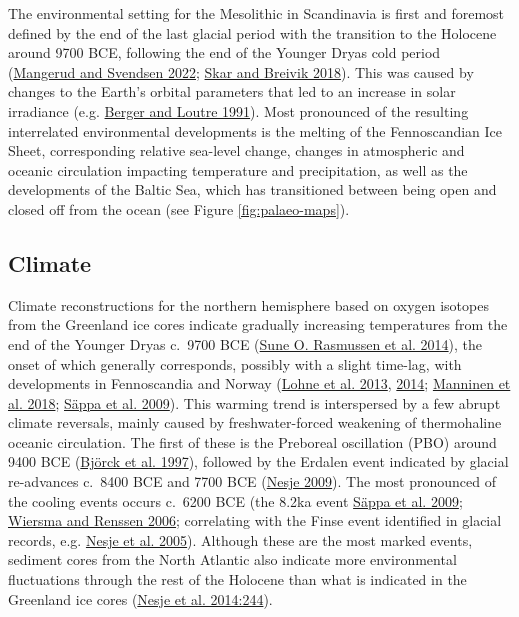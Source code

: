 \documentclass[
  12pt,
  a4paper,
  oneside]{book}
\begin{document}
The environmental setting for the Mesolithic in Scandinavia is first and foremost defined by the end of the last glacial period with the transition to the Holocene around 9700 BCE, following the end of the Younger Dryas cold period (\protect\hyperlink{ref-mangerud2022}{Mangerud and Svendsen 2022}; \protect\hyperlink{ref-skar2018}{Skar and Breivik 2018}). This was caused by changes to the Earth's orbital parameters that led to an increase in solar irradiance (e.g. \protect\hyperlink{ref-berger1991}{Berger and Loutre 1991}). Most pronounced of the resulting interrelated environmental developments is the melting of the Fennoscandian Ice Sheet, corresponding relative sea-level change, changes in atmospheric and oceanic circulation impacting temperature and precipitation, as well as the developments of the Baltic Sea, which has transitioned between being open and closed off from the ocean (see Figure \ref{fig:palaeo-maps}).

\hypertarget{climate}{%
\subsection{Climate}\label{climate}}

Climate reconstructions for the northern hemisphere based on oxygen isotopes from the Greenland ice cores indicate gradually increasing temperatures from the end of the Younger Dryas c.~9700 BCE (\protect\hyperlink{ref-rasmussen2014}{Sune O. Rasmussen et al. 2014}), the onset of which generally corresponds, possibly with a slight time-lag, with developments in Fennoscandia and Norway (\protect\hyperlink{ref-lohne2013}{Lohne et al. 2013}, \protect\hyperlink{ref-lohne2014}{2014}; \protect\hyperlink{ref-manninen2018}{Manninen et al. 2018}; \protect\hyperlink{ref-seppa2009}{Säppa et al. 2009}). This warming trend is interspersed by a few abrupt climate reversals, mainly caused by freshwater-forced weakening of thermohaline oceanic circulation. The first of these is the Preboreal oscillation (PBO) around 9400 BCE (\protect\hyperlink{ref-bjorck1997}{Björck et al. 1997}), followed by the Erdalen event indicated by glacial re-advances c.~8400 BCE and 7700 BCE (\protect\hyperlink{ref-nesje2009}{Nesje 2009}). The most pronounced of the cooling events occurs c.~6200 BCE (the 8.2ka event \protect\hyperlink{ref-seppa2009}{Säppa et al. 2009}; \protect\hyperlink{ref-wiersma2006}{Wiersma and Renssen 2006}; correlating with the Finse event identified in glacial records, e.g. \protect\hyperlink{ref-nesje2005}{Nesje et al. 2005}). Although these are the most marked events, sediment cores from the North Atlantic also indicate more environmental fluctuations through the rest of the Holocene than what is indicated in the Greenland ice cores (\protect\hyperlink{ref-nesje2014}{Nesje et al. 2014:244}).
\end{document}
